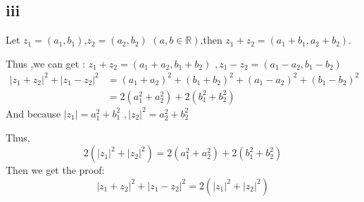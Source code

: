 \documentclass[11pt,twoside,a4paper]{article}
\begin{document}
\subsection{iii}
Let 
$z{_1}=(a{_1},b{_1})$,$z{_2}=(a{_2},b{_2})$ $(a, b \in \mathbb{R})$,then $z{_1}+z{_2}=(a{_1}+b{_1},a{_2}+b{_2})$.\par Thus ,we can get :
$z_{1}+z_{2}=(a_{1}+a_{2}, b_{1}+b_{2}) \,\, ,
z_{1}-z_{2}=(a_{1}-a_{2}, b_{1}-b_{2}) $
\begin{align*}
|z_{1}+z_{2}|^{2}+|z_{1}-z_{2}|^{2}&=(a_{1}+a_{2})^{2}+(b_{1}+b_{2})^{2}+(a_{1}-a_{2})^{2}+(b_{1}-b_{2})^{2}\\
&=2(a_{1}^{2}+a_{2}^{2})+2(b_{1}^{2}+b_{2}^{2})
\end{align*}
And because
$|z_{1}|=a_{1}^{2}+b_{1}^{2} \,\, ,
|z_{2}|^{2}=a_{2}^{2}+b_{2}^{2} $ \par Thus,
$$2(|z_{1}|^{2}+|z_{2}|^{2})=2(a_{1}^{2}+a_{2}^{2})+2(b_{1}^{2}+b_{2}^{2})$$
Then we get the proof:
$$|z_{1}+z_{2}|^{2}+|z_{1}-z_{2}|^{2}=2(|z_{1}|^{2}+|z_{2}|^{2})$$
\end{document}
